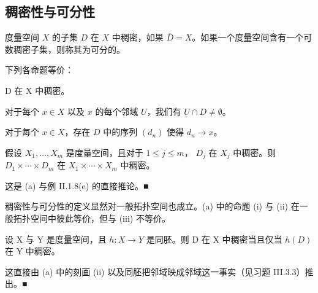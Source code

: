 \subsection*{稠密性与可分性}

度量空间 $X$ 的子集 $D$ 在 $X$ 中稠密，如果 $\overline{D} = X$。如果一个度量空间含有一个可数稠密子集，则称其为可分的。

\begin{remark}

\begin{items}
\item

下列各命题等价：

\begin{subitems}
\item

D 在 X 中稠密。

\item

对于每个  $ x \in X $ 以及  $ x $ 的每个邻域  $ U $，我们有  $ U \cap D \neq \emptyset $。

\item

对于每个  $ x \in X $，存在  $ D $ 中的序列  $ (d_n) $ 使得  $ d_n \to x $。

\end{subitems}

\item

假设  $ X_1, \ldots, X_m $ 是度量空间，且对于  $ 1 \leq j \leq m $， $ D_j $ 在  $ X_j $ 中稠密。则  $ D_1 \times \cdots \times D_m $ 在  $ X_1 \times \cdots \times X_m $ 中稠密。

\proofhead
这是 (a) 与例 II.1.8(e) 的直接推论。■
\item

稠密性与可分性的定义显然对一般拓扑空间也成立。(a) 中的命题 (i) 与 (ii) 在一般拓扑空间中彼此等价，但与 (iii) 不等价。

\item

设 X 与 Y 是度量空间，且  $ h: X \to Y $ 是同胚。则 D 在 X 中稠密当且仅当  $ h(D) $ 在 Y 中稠密。

\proofhead
这直接由 (a) 中的刻画 (ii) 以及同胚把邻域映成邻域这一事实（见习题 III.3.3）推出。■
\end{items}

\end{remark}

